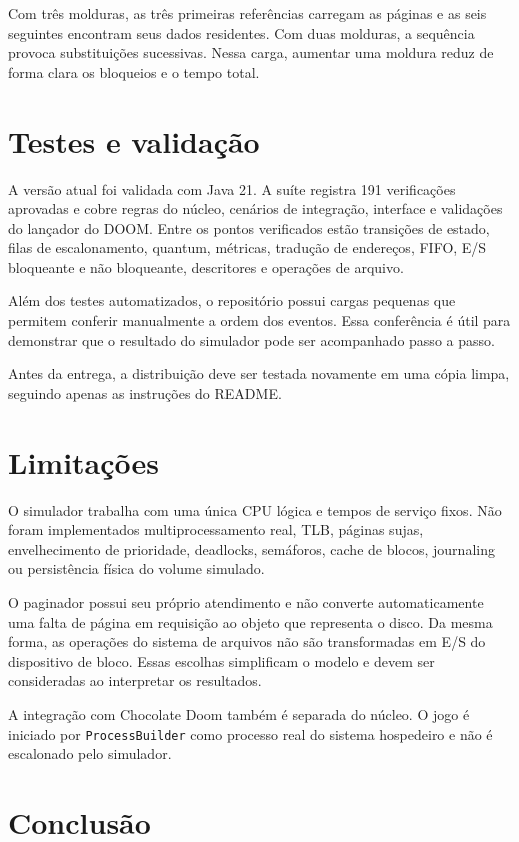 \documentclass[11pt,a4paper]{article}
\begin{document}
Com três molduras, as três primeiras referências carregam as páginas e as seis seguintes encontram seus dados residentes. Com duas molduras, a sequência provoca substituições sucessivas. Nessa carga, aumentar uma moldura reduz de forma clara os bloqueios e o tempo total.

\section{Testes e validação}

A versão atual foi validada com Java 21. A suíte registra 191 verificações aprovadas e cobre regras do núcleo, cenários de integração, interface e validações do lançador do DOOM. Entre os pontos verificados estão transições de estado, filas de escalonamento, quantum, métricas, tradução de endereços, FIFO, E/S bloqueante e não bloqueante, descritores e operações de arquivo.

Além dos testes automatizados, o repositório possui cargas pequenas que permitem conferir manualmente a ordem dos eventos. Essa conferência é útil para demonstrar que o resultado do simulador pode ser acompanhado passo a passo.

Antes da entrega, a distribuição deve ser testada novamente em uma cópia limpa, seguindo apenas as instruções do README.

\section{Limitações}

O simulador trabalha com uma única CPU lógica e tempos de serviço fixos. Não foram implementados multiprocessamento real, TLB, páginas sujas, envelhecimento de prioridade, deadlocks, semáforos, cache de blocos, journaling ou persistência física do volume simulado.

O paginador possui seu próprio atendimento e não converte automaticamente uma falta de página em requisição ao objeto que representa o disco. Da mesma forma, as operações do sistema de arquivos não são transformadas em E/S do dispositivo de bloco. Essas escolhas simplificam o modelo e devem ser consideradas ao interpretar os resultados.

A integração com Chocolate Doom também é separada do núcleo. O jogo é iniciado por \texttt{ProcessBuilder} como processo real do sistema hospedeiro e não é escalonado pelo simulador.

\section{Conclusão}
\end{document}
